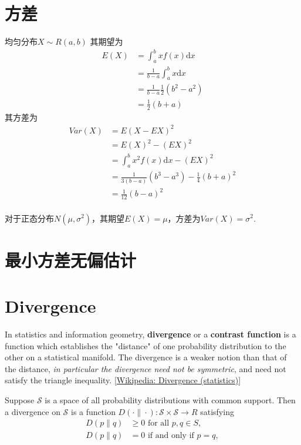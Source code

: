 \section{方差}
均匀分布$X \sim R(a, b)$
其期望为
\begin{equation}
    \begin{split}
        E(X) &= \int_{a}^{b}x f(x) \mathrm{d}x		\\
        &= \frac{1}{b-a}\int_{a}^{b}x\mathrm{d}x	\\
        &= \frac{1}{b-a} \frac{1}{2} (b^2 - a^2)	\\
        &= \frac{1}{2}(b + a)
    \end{split}
\end{equation}
其方差为
\begin{equation}
    \begin{split}
        Var(X) &= E(X - EX)^2  \\
        &= E(X)^2 - (EX)^2 \\
        &= \int_{a}^{b} x^2 f(x) \mathrm{d}x - (EX)^2 \\
        &= \frac{1}{3(b-a)} (b^3 - a^3) - \frac{1}{4}(b+a)^2 \\
        &= \frac{1}{12}(b-a)^2
    \end{split}
\end{equation}
\\
对于正态分布$N(\mu, \sigma ^2)$，其期望$E(X) = \mu$，方差为$Var(X) = \sigma^2$.


\section{最小方差无偏估计}


\section{Divergence}
In statistics and information geometry, \textbf{divergence} or a \textbf{contrast function} is a function
which establishes the "distance" of one probability distribution to the other on a statistical manifold.
The divergence is a weaker notion than that of the distance, \textit{in particular the divergence need not be symmetric},
and need not satisfy the triangle inequality. [\href{https://en.wikipedia.org/wiki/Divergence_(statistics)}{Wikipedia: Divergence (statistics)}]

Suppose $\mathcal{S}$ is a space of all probability distributions with common support.
Then a divergence on $\mathcal{S}$ is a function $D(\cdot\|\cdot): \mathcal{S} \times \mathcal{S} \rightarrow R$ satisfying
\begin{equation}
    \begin{split}
        D(p\|q) &\geq 0 \text{ for all }p, q \in S, \\
        D(p\|q) &= 0\text{ if and only if }p = q,
    \end{split}
\end{equation}

